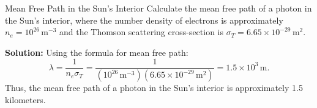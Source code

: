 \begin{example}{Mean Free Path in the Sun's Interior}
Calculate the mean free path of a photon in the Sun's interior, where the number density of electrons is approximately $n_e = 10^{26} \, \text{m}^{-3}$ and the Thomson scattering cross-section is $\sigma_T = 6.65 \times 10^{-29} \, \text{m}^2$.

\textbf{Solution:}
Using the formula for mean free path:
\begin{equation}
    \lambda = \frac{1}{n_e \sigma_T} = \frac{1}{(10^{26} \, \text{m}^{-3})(6.65 \times 10^{-29} \, \text{m}^2)} = 1.5 \times 10^3 \, \text{m}.
\end{equation}
Thus, the mean free path of a photon in the Sun's interior is approximately 1.5 kilometers.
\end{example}
